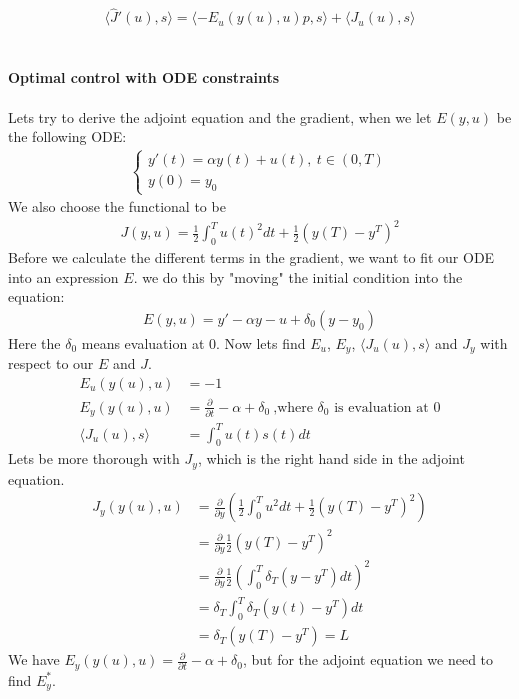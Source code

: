 \documentclass[11pt,a4paper]{report}
\begin{document}
\begin{gather}
\langle\hat{J}'(u),s\rangle=\langle -E_u(y(u),u)p,s\rangle +\langle J_u(u),s\rangle
\end{gather} 
\\
\\
\textbf{Optimal control with ODE constraints}
\\
\\
Lets try to derive the adjoint equation and the gradient, when we let $E(y,u)$ be the following ODE:
\begin{align*}
\left\{
     \begin{array}{lr}
       	y'(t)=\alpha y(t) +u(t), \ t \in (0,T)\\
       	   y(0)=y_0
     \end{array}
   \right.
\end{align*}
We also choose the functional to be
\begin{align*}
J(y,u) = \frac{1}{2}\int_0^Tu(t)^2dt + \frac{1}{2}(y(T)-y^T)^2
\end{align*}
Before we calculate the different terms in the gradient, we want to fit our ODE into an expression $E$. we do this by "moving" the initial condition into the equation:
\begin{align*}
E(y,u) = y'-\alpha y - u + \delta_0(y-y_0)
\end{align*}
Here the $\delta_0$ means evaluation at $0$. Now  lets find $E_u$, $E_y$, $ \langle J_u(u),s\rangle$ and $J_y$ with respect to our $E$ and $J$.
\begin{align*}
E_u(y(u),u)&=-1 \\
E_y(y(u),u)&=\frac{\partial}{\partial t} - \alpha + \delta_0 \ \text{,where $\delta_0$ is evaluation at 0} \\
\langle J_u(u),s\rangle &= \int_0^T u(t)s(t) dt 
\end{align*}
Lets be more thorough with $J_y$, which is the right hand side in the adjoint equation.
\begin{align*}
J_y(y(u),u) &= \frac{\partial}{\partial y}(\frac{1}{2}\int_0^Tu^2dt + \frac{1}{2}(y(T)-y^T)^2) \\ &= \frac{\partial}{\partial y} \frac{1}{2}(y(T)-y^T)^2 \\
&= \frac{\partial}{\partial y}\frac{1}{2}(\int_0^T \delta_T(y-y^T)dt)^2 \\
&= \delta_T\int_0^T \delta_T(y(t)-y^T)dt \\
&= \delta_T(y(T)-y^T)=L
\end{align*}
We have $E_y(y(u),u)=\frac{\partial}{\partial t} - \alpha + \delta_0$, but for the adjoint equation we need to find $E_y^*$.
\end{document}
